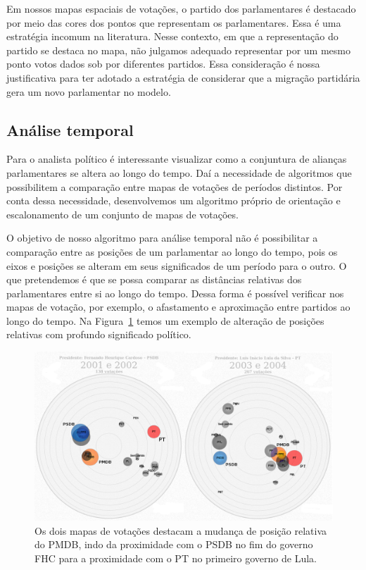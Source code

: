 \documentclass[a4paper, 12pt]{article}
\begin{document}
Em nossos mapas espaciais de votações, o partido dos parlamentares é destacado por meio das cores dos pontos que representam os parlamentares. Essa é uma estratégia incomum na literatura. Nesse contexto, em que a representação do partido se destaca no mapa, não julgamos adequado representar por um mesmo ponto votos dados sob por diferentes partidos. Essa consideração é nossa justificativa para ter adotado a estratégia de considerar que a migração partidária gera um novo parlamentar no modelo.

\subsection{Análise temporal}

Para o analista político é interessante visualizar como a conjuntura de alianças parlamentares se altera ao longo do tempo. Daí a necessidade de algoritmos que possibilitem a comparação entre mapas de votações de períodos distintos. Por conta dessa necessidade, desenvolvemos um algoritmo próprio de orientação e escalonamento de um conjunto de mapas de votações.

O objetivo de nosso algoritmo para análise temporal não é possibilitar a comparação entre as posições de um parlamentar ao longo do tempo, pois os eixos e posições se alteram em seus significados de um período para o outro. O que pretendemos é que se possa comparar as distâncias relativas dos parlamentares entre si ao longo do tempo. Dessa forma é possível verificar nos mapas de votação, por exemplo, o afastamento e aproximação entre partidos ao longo do tempo. Na Figura~\ref{fig:fhc2-lula1} temos um exemplo de alteração de posições relativas com profundo significado político. \\

\begin{figure}[h]
  \centering
  \includegraphics[scale=0.37]{figs/fhc2-lula1.png}
  \caption{Os dois mapas de votações destacam a mudança de posição relativa do PMDB, indo da proximidade com o PSDB no fim do governo FHC para a proximidade com o PT no primeiro governo de Lula.}
  \label{fig:fhc2-lula1}
\end{figure}
\end{document}
